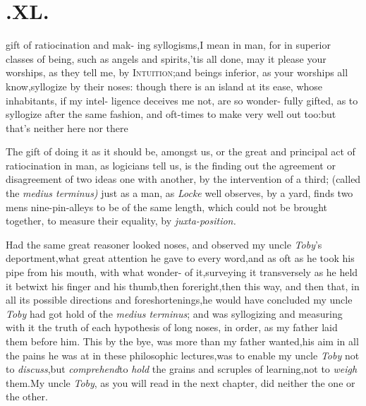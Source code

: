 \documentclass{article}
\begin{document}
\bigskip


\newpage
\null
\section{.\quad  XL.}

 gift of ratiocination and mak-\break
ing syllogisms,\tsh I mean in man,\break
\tsk for in superior classes of being, such\break
as angels and spirits,\tsh ’tis all done, may\break
it please your worships, as they tell me,\break
by \textsc{Intuition};\tsk and beings inferior, as\break
your worships all know,\tsk\tsk syllogize by\break
their noses: though there is an island\break
{}\break
at its ease, whose inhabitants, if my intel-\break
ligence deceives me not, are so wonder-\break
fully gifted, as to syllogize after the same\break
fashion, and oft-times to make very well\break
out too:\tsh but that’s neither here nor\break
there\tsh

The gift of doing it as it should be, amongst us, \tsk or the
great and principal act of ratiocination in man, as logicians tell
us, is the finding out the agreement or disagreement of two ideas
one with another, by the intervention of a third; (called the
\textit{medius terminus)\sic} just as a man, as \textit{Locke} well
observes, by a yard, finds two mens nine-pin-alleys to be of the same
length, which could not be brought together, to measure their
equality, by \textit{juxta-position.}

Had the same great reasoner looked  noses, and observed my uncle \textit{Toby}’s
deportment,\tsk what great attention he gave to every
word,\tsk and as oft as he took his pipe from his mouth, with what
wonder-\break {} of
it,\tsk surveying it transversely as he held it betwixt his
finger and his thumb,\break\tsk then foreright,\tsk then
this way, and then that, in all its possible directions and
foreshortenings,\tsh he would have concluded my uncle
\textit{Toby} had got hold of the \textit{medius terminus}; and was
syllogizing and measuring with it the truth of each hypothesis of
long noses, in order, as my father laid them before him. This
by the bye, was more than my father wanted,\tsh his aim in
all the pains he was at in these philosophic lectures,\tsk was to
enable my uncle \textit{Toby} not to
\textit{discuss},\tsk but \textit{comprehend}\tsk to \textit{hold} the grains
and scruples of learning,\tsk not to \textit{weigh}
them.\tsk\break My uncle \textit{Toby}, as you will read in the
next chapter, did neither the one or the other.
\end{document}
